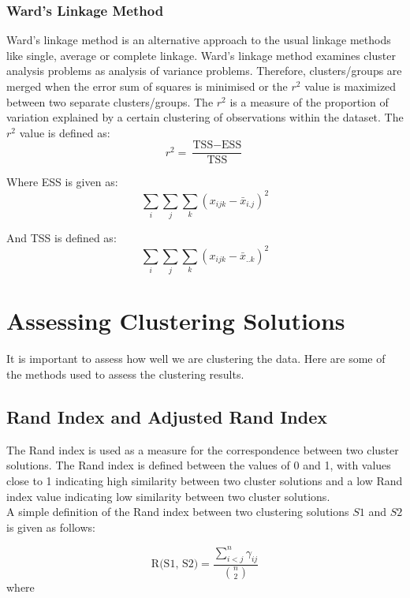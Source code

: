 \documentclass[]{article}
\begin{document}
\subsubsection{Ward's Linkage Method}
\noindent Ward's linkage method is an alternative approach to the usual linkage methods like single, average or complete linkage. Ward's linkage method examines cluster analysis problems as analysis of variance problems. Therefore, clusters/groups are merged when the error sum of squares is minimised or the $r^2$ value is maximized between two separate clusters/groups. The $r^2$ is a measure of the proportion of variation explained by a certain clustering of observations within the dataset. The $r^2$ value is defined as:
\begin{equation}
r^2 = \frac{\text{TSS} - \text{ESS}}{\text{TSS}}
\end{equation} 

\noindent Where ESS is given as: 
\begin{equation}
\sum_{i}^{} \sum_{j}^{} \sum_{k}^{} (x_{ijk} - \bar{x}_{i.j})^2
\end{equation} 

\noindent And TSS is defined as:
\begin{equation}
\sum_{i}^{} \sum_{j}^{} \sum_{k}^{} (x_{ijk} - \bar{x}_{..k})^2
\end{equation} 


\section{Assessing Clustering Solutions}
It is important to assess how well we are clustering the data. Here are some of the methods used to assess the clustering results.

\subsection{Rand Index and Adjusted Rand Index}
The Rand index is used as a measure for the correspondence between two cluster solutions. The Rand index is defined between the values of 0 and 1, with values close to 1 indicating high similarity between two cluster solutions and a low Rand index value indicating low similarity between two cluster solutions. \\

\noindent A simple definition of the Rand index between two clustering solutions $S1$ and $S2$ is given as follows:

\begin{equation}
	\text{R(S1, S2)} = \frac{\sum_{i < j}^{n}\gamma_{ij}}{{{n}\choose{2}}}
\end{equation}
where
\end{document}
